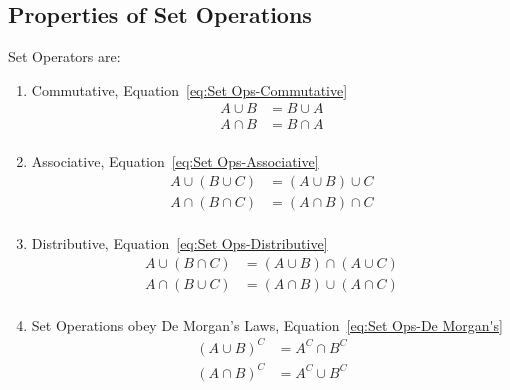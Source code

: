 	\subsection{Properties of Set Operations} \label{subsec:Properties of Set Ops}
	Set Operators are:
	\begin{enumerate}
		\item Commutative, Equation~\eqref{eq:Set Ops-Commutative}
			\begin{equation} %
				\begin{aligned}
					A \cup B &= B \cup A \\
					A \cap B &= B \cap A \\
				\end{aligned}
				\label{eq:Set Ops-Commutative}
			\end{equation}
			
			\item Associative, Equation~\eqref{eq:Set Ops-Associative}
				\begin{equation} %
					\begin{aligned}
						A \cup \left( B \cup C \right) &= \left( A \cup B \right) \cup C \\
						A \cap \left( B \cap C \right) &= \left( A \cap B \right) \cap C \\
					\end{aligned}
					\label{eq:Set Ops-Associative}
				\end{equation}
			
			\item Distributive, Equation~\eqref{eq:Set Ops-Distributive}
				\begin{equation} %
					\begin{aligned}
						A \cup \left( B \cap C \right) &= \left( A \cup B \right) \cap \left( A \cup C \right) \\
						A \cap \left( B \cup C \right) &= \left( A \cap B \right) \cup \left( A \cap C \right) \\
					\end{aligned}
					\label{eq:Set Ops-Distributive}
				\end{equation}
			
			\item Set Operations obey De Morgan's Laws, Equation~\eqref{eq:Set Ops-De Morgan's}
				\begin{equation} %
					\begin{aligned}
						\left( A \cup B \right)^{C} &= A^{C} \cap B^{C} \\
						\left( A \cap B \right)^{C} &= A^{C} \cup B^{C} \\
					\end{aligned}
					\label{eq:Set Ops-De Morgan's}
				\end{equation}
			
	\end{enumerate}
